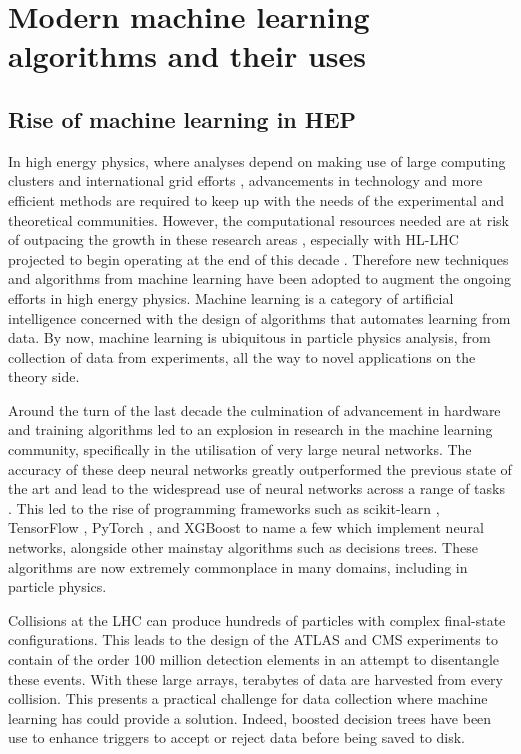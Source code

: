 \documentclass[main.tex]{subfiles}
\begin{document}
\chapter{Modern machine learning algorithms and their uses}
\label{chapter:ml}
\section{Rise of machine learning in HEP}
    In high energy physics, where analyses
    depend on making use of large computing clusters
    and international grid efforts \cite{WLCG}, advancements
    in technology and more efficient methods are
    required to keep up with the needs of the
    experimental and theoretical communities.
    However, the computational resources needed
    are at risk of outpacing the growth in these research
    areas \cite{Bothmann:2022thx}, especially with
    HL-LHC projected to begin operating at the end
    of this decade \cite{ZurbanoFernandez:2020cco}.
    Therefore new techniques and
    algorithms from machine learning 
    have been adopted to augment the ongoing efforts
    in high energy physics. Machine
    learning is a category of artificial intelligence
    concerned with the design of algorithms that
    automates learning from data.
    By now, machine learning is ubiquitous in
    particle physics analysis, from collection
    of data from experiments, all the way to novel
    applications on the theory side.

    Around the turn of the last decade the culmination
    of advancement in hardware and training algorithms
    led to an explosion in research in the
    machine learning community, specifically in the
    utilisation of very large neural networks. The accuracy
    of these deep neural networks greatly outperformed the
    previous state of the art \cite{NIPS2012_c399862d,russakovsky2015imagenet} and
    lead to the widespread use of neural networks across
    a range of tasks \cite{Schmidhuber_2015}.
    This led to the rise of programming
    frameworks such as scikit-learn \cite{scikit-learn},
    TensorFlow \cite{tensorflow2015-whitepaper},
    PyTorch \cite{paszke2019pytorch},
    and XGBoost \cite{Chen:2016:XST:2939672.2939785}
    to name a few which implement neural networks, alongside
    other mainstay algorithms such as decisions trees.
    These algorithms are now extremely commonplace
    in many domains, including in particle physics. 

    Collisions at the LHC can produce hundreds of
    particles with complex final-state configurations.
    This leads to the design of the ATLAS and CMS experiments
    to contain of the order 100 million detection elements
    in an attempt to disentangle these events. With these large
    arrays, terabytes of data are harvested from
    every collision. This presents a practical challenge for data
    collection where machine learning has could provide a solution.
    Indeed, boosted decision trees have been use
    to enhance triggers \cite{CMS:2020cmk} to accept or
    reject data before being saved to disk.
\end{document}
